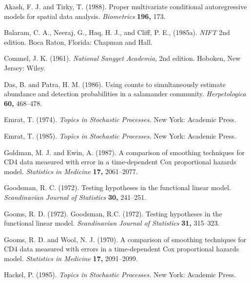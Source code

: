 \documentclass[useAMS,usenatbib,referee]{example/biom}
\begin{document}
\begin{thebibliography}{}
Akash, F. J. and Tirky, T. (1988). Proper multivariate conditional
autoregressive models for spatial data analysis. {\it Biometrics} {\bf 196,} 173.

Balaram, C. A., Neeraj, G., Haq, H. J., and Cliff, P. E., (1985a). {\it
NIFT\/} 2nd edition. Boca Raton, Florida: Chapman and Hall.

Commel, J. K. (1961). {\it National Sangget Academia}, 2nd edition.
Hoboken, New Jersey: Wiley.

Das, B. and Patra, H. M. (1986). Using counts to simultaneously estimate
abundance and detection probabilities in a salamander community. {\it
Herpetologica} {\bf 60,} 468--478.

 Emrat, T. (1974).
{\it Topics in Stochastic Processes.} New York: Academic  Press.

 Emrat, T. (1985).
{\it Topics in Stochastic Processes.} New York: Academic  Press.

Goldman, M. J. and Ewin, A. (1987). A comparison of smoothing
techniques for CD4 data measured with error in a time-dependent Cox
proportional hazards model. {\it Statistics in Medicine} {\bf 17,} 2061--2077.

Goodsman, R. C. (1972). Testing hypotheses in the functional linear
model. {\it Scandinavian Journal of Statistics} {\bf 30,} 241--251.

 Gooms, R. D.
(1972). Goodsman, R.C. (1972). Testing hypotheses in the functional linear
model. {\it Scandinavian Journal of Statistics} {\bf 31,} 315--323.


 Gooms,
R. D. and Wool, N. J. (1970). A comparison of smoothing
techniques for CD4 data measured with errors in a time-dependent Cox
proportional hazards model. {\it Statistics in Medicine} {\bf 17,} 2091--2099.

Hackel, P. (1985). {\it Topics in Stochastic Processes.} New York: Academic  Press.


\end{thebibliography}
\end{document}
